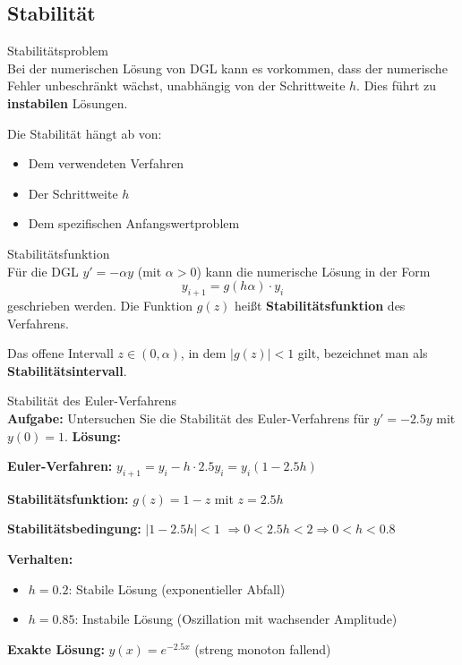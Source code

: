 \subsection{Stabilität}

\begin{concept}{Stabilitätsproblem}\\
Bei der numerischen Lösung von DGL kann es vorkommen, dass der numerische Fehler unbeschränkt wächst, unabhängig von der Schrittweite $h$. Dies führt zu \textbf{instabilen} Lösungen.

Die Stabilität hängt ab von:
\begin{itemize}
    \item Dem verwendeten Verfahren
    \item Der Schrittweite $h$
    \item Dem spezifischen Anfangswertproblem
\end{itemize}
\end{concept}

\begin{definition}{Stabilitätsfunktion}\\
Für die DGL $y' = -\alpha y$ (mit $\alpha > 0$) kann die numerische Lösung in der Form
$$y_{i+1} = g(h\alpha) \cdot y_i$$
geschrieben werden. Die Funktion $g(z)$ heißt \textbf{Stabilitätsfunktion} des Verfahrens.

Das offene Intervall $z \in (0, \alpha)$, in dem $|g(z)| < 1$ gilt, bezeichnet man als \textbf{Stabilitätsintervall}.
\end{definition}

\begin{example2}{Stabilität des Euler-Verfahrens}\\
\textbf{Aufgabe:} Untersuchen Sie die Stabilität des Euler-Verfahrens für $y' = -2.5y$ mit $y(0) = 1$.
\tcblower
\textbf{Lösung:}

\textbf{Euler-Verfahren:} $y_{i+1} = y_i - h \cdot 2.5 y_i = y_i(1 - 2.5h)$

\textbf{Stabilitätsfunktion:} $g(z) = 1 - z$ mit $z = 2.5h$

\textbf{Stabilitätsbedingung:} $|1 - 2.5h| < 1$
$\Rightarrow 0 < 2.5h < 2 \Rightarrow 0 < h < 0.8$

\textbf{Verhalten:}
\begin{itemize}
    \item $h = 0.2$: Stabile Lösung (exponentieller Abfall)
    \item $h = 0.85$: Instabile Lösung (Oszillation mit wachsender Amplitude)
\end{itemize}

\textbf{Exakte Lösung:} $y(x) = e^{-2.5x}$ (streng monoton fallend)
\end{example2}

